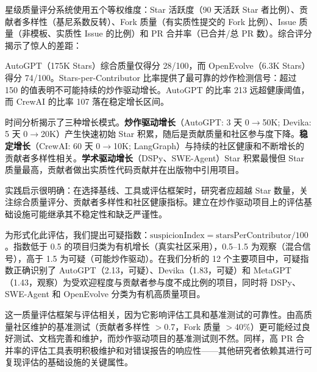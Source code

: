 星级质量评分系统使用五个等权维度：Star 活跃度（90 天活跃 Star 者比例）、贡献者多样性（基尼系数反转）、Fork 质量（有实质性提交的 Fork 比例）、Issue 质量（非模板、实质性 Issue 的比例）和 PR 合并率（已合并/总 PR 数）。综合评分揭示了惊人的差距：

AutoGPT（175K Stars）综合质量仅得分 28/100，而 OpenEvolve（6.3K Stars）得分 74/100。Stars-per-Contributor 比率提供了最可靠的炒作检测信号：超过 150 的值表明不可能持续的炒作驱动增长。AutoGPT 的比率 213 远超健康阈值，而 CrewAI 的比率 107 落在稳定增长区间。

时间分析揭示了三种增长模式。\textbf{炒作驱动增长}（AutoGPT: 3 天 0$\to$50K; Devika: 5 天 0$\to$20K）产生快速初始 Star 积累，随后是贡献质量和社区参与度下降。\textbf{稳定增长}（CrewAI: 60 天 0$\to$10K; LangGraph）与持续的社区健康和不断增长的贡献者多样性相关。\textbf{学术驱动增长}（DSPy、SWE-Agent）Star 积累最慢但 Star 质量最高，贡献者做出实质性代码贡献并在出版物中引用项目。

实践启示很明确：在选择基线、工具或评估框架时，研究者应超越 Star 数量，关注综合质量评分、贡献者多样性和社区健康指标。建立在炒作驱动项目上的评估基础设施可能继承其不稳定性和缺乏严谨性。

为形式化此评估，我们提出可疑指数：$\text{suspicionIndex} = \text{starsPerContributor} / 100$。指数低于 0.5 的项目归类为有机增长（真实社区采用），0.5--1.5 为观察（混合信号），高于 1.5 为可疑（可能炒作驱动）。在我们分析的 12 个主要项目中，可疑指数正确识别了 AutoGPT（2.13，可疑）、Devika（1.83，可疑）和 MetaGPT（1.43，观察）为受欢迎程度与贡献者参与度不成比例的项目，同时将 DSPy、SWE-Agent 和 OpenEvolve 分类为有机高质量项目。

这一质量评估框架与评估相关，因为它影响评估工具和基准测试的可靠性。由高质量社区维护的基准测试（贡献者多样性 $>$0.7，Fork 质量 $>$40\%）更可能经过良好测试、文档完善和维护，而炒作驱动项目的基准测试则不然。同样，高 PR 合并率的评估工具表明积极维护和对错误报告的响应性——其他研究者依赖其进行可复现评估的基础设施的关键属性。

